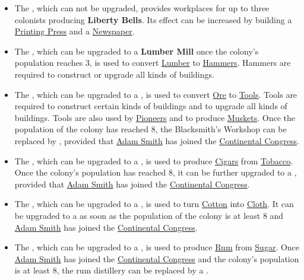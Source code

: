 \documentclass[12pt]{book}
\begin{document}
\begin{itemize}
\item The , which can not be upgraded, provides
  workplaces for up to three colonists producing \textbf{Liberty
  Bells}. Its effect can be increased by building a
  \hyperlink{Printing Press}{Printing Press} and a
  \hyperlink{Newspaper}{Newspaper}.

\item The , which can be upgraded to a
  \textbf{Lumber Mill} once the colony's population reaches 3, is used
  to convert \hyperlink{Lumber}{Lumber} to
  \hyperlink{Hammers}{Hammers}. Hammers are required to construct or
  upgrade all kinds of buildings.

\item The , which can be upgraded to a
  , is used to convert
  \hyperlink{Ore}{Ore} to \hyperlink{Tools}{Tools}. Tools are required
  to construct certain kinds of buildings and to upgrade all kinds of
  buildings. Tools are also used by \hyperlink{Pioneer}{Pioneers} and
  to produce \hyperlink{Muskets}{Muskets}. Once the population of the
  colony has reached 8, the Blacksmith's Workshop can be replaced by
  , provided that \hyperlink{Adam Smith}{Adam
  Smith} has joined the \hyperlink{Continental Congress}{Continental
  Congress}.

\item The , which can be upgraded to a
  , is used to produce
  \hyperlink{Cigars}{Cigars} from \hyperlink{Tobacco}{Tobacco}.  Once
  the colony's population has reached 8, it can be further upgraded to
  a , provided that \hyperlink{Adam
  Smith}{Adam Smith} has joined the \hyperlink{Continental
  Congress}{Continental Congress}.

\item The , which can be upgraded to a
  , is used to turn \hyperlink{Cotton}{Cotton}
  into \hyperlink{Cloth}{Cloth}. It can be upgraded to a
   as soon as the population of the colony is
  at least 8 and \hyperlink{Adam Smith}{Adam Smith} has joined the
  \hyperlink{Continental Congress}{Continental Congress}.

\item The , which can be upgraded to a
  , is used to produce \hyperlink{Rum}{Rum}
  from \hyperlink{Sugar}{Sugar}. Once \hyperlink{Adam Smith}{Adam
  Smith} has joined the \hyperlink{Continental Congress}{Continental
  Congress} and the colony's population is at least 8, the rum
  distillery can be replaced by a .


\end{itemize}
\end{document}
